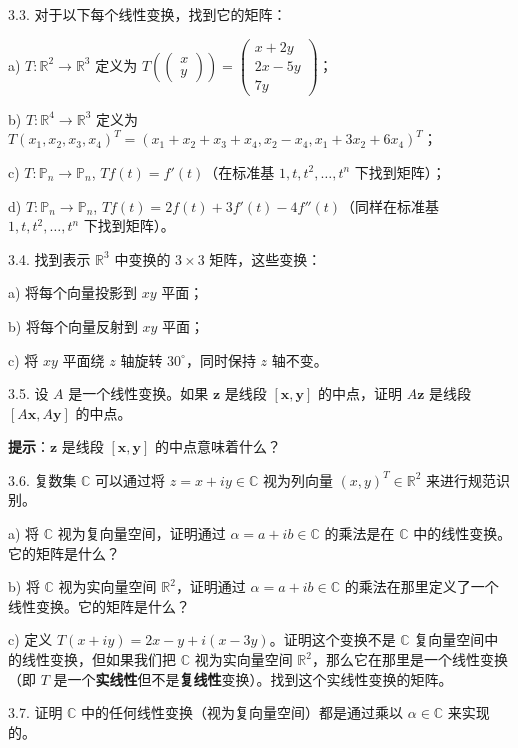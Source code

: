 3.3. 对于以下每个线性变换，找到它的矩阵：

a) $T: \mathbb{R}^2 \to \mathbb{R}^3$ 定义为 $T(\begin{pmatrix} x \\ y \end{pmatrix}) = \begin{pmatrix} x + 2y \\ 2x - 5y \\ 7y \end{pmatrix}$；

b) $T: \mathbb{R}^4 \to \mathbb{R}^3$ 定义为 $T(x_1, x_2, x_3, x_4)^T = (x_1 + x_2 + x_3 + x_4, x_2 - x_4, x_1 + 3x_2 + 6x_4)^T$；

c) $T: \mathbb{P}_n \to \mathbb{P}_n$, $T f(t) = f'(t)$（在标准基 $1, t, t^2, \dots, t^n$ 下找到矩阵）；

d) $T: \mathbb{P}_n \to \mathbb{P}_n$, $T f(t) = 2 f(t) + 3 f'(t) - 4 f''(t)$（同样在标准基 $1, t, t^2, \dots, t^n$ 下找到矩阵）。

3.4. 找到表示 $\mathbb{R}^3$ 中变换的 $3 \times 3$ 矩阵，这些变换：

a) 将每个向量投影到 $xy$ 平面；

b) 将每个向量反射到 $xy$ 平面；

c) 将 $xy$ 平面绕 $z$ 轴旋转 $30^\circ$，同时保持 $z$ 轴不变。

3.5. 设 $A$ 是一个线性变换。如果 $\mathbf{z}$ 是线段 $[\mathbf{x}, \mathbf{y}]$ 的中点，证明 $A \mathbf{z}$ 是线段 $[A \mathbf{x}, A \mathbf{y}]$ 的中点。

\textbf{提示}：$\mathbf{z}$ 是线段 $[\mathbf{x}, \mathbf{y}]$ 的中点意味着什么？

3.6. 复数集 $\mathbb{C}$ 可以通过将 $z = x + iy \in \mathbb{C}$ 视为列向量 $(x, y)^T \in \mathbb{R}^2$ 来进行规范识别。

a) 将 $\mathbb{C}$ 视为复向量空间，证明通过 $\alpha = a + ib \in \mathbb{C}$ 的乘法是在 $\mathbb{C}$ 中的线性变换。它的矩阵是什么？

b) 将 $\mathbb{C}$ 视为实向量空间 $\mathbb{R}^2$，证明通过 $\alpha = a + ib \in \mathbb{C}$ 的乘法在那里定义了一个线性变换。它的矩阵是什么？

c) 定义 $T(x + iy) = 2x - y + i(x - 3y)$。证明这个变换不是 $\mathbb{C}$ 复向量空间中的线性变换，但如果我们把 $\mathbb{C}$ 视为实向量空间 $\mathbb{R}^2$，那么它在那里是一个线性变换（即 $T$ 是一个\textbf{实线性}但不是\textbf{复线性}变换）。找到这个实线性变换的矩阵。

3.7. 证明 $\mathbb{C}$ 中的任何线性变换（视为复向量空间）都是通过乘以 $\alpha \in \mathbb{C}$ 来实现的。


